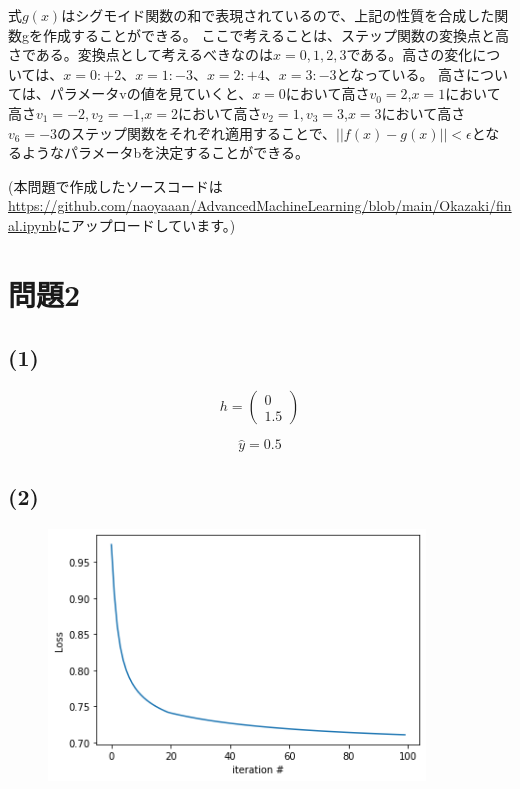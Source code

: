 \documentclass[a4j,11pt]{jarticle}
\begin{document}
式$g(x)$はシグモイド関数の和で表現されているので、上記の性質を合成した関数gを作成することができる。
ここで考えることは、ステップ関数の変換点と高さである。変換点として考えるべきなのは$x = 0,1,2,3$である。高さの変化については、$x=0:+2$、$x=1:-3$、$x=2:+4$、$x=3:-3$となっている。
高さについては、パラメータvの値を見ていくと、$x=0$において高さ$v_0 = 2$,$x=1$において高さ$v_1 = -2,v_2 = -1$,$x=2$において高さ$v_2 = 1,v_3 = 3$,$x=3$において高さ$v_6 = -3$のステップ関数をそれぞれ適用することで、$||f(x) - g(x)|| < \epsilon$となるようなパラメータbを決定することができる。

(本問題で作成したソースコードは\url{https://github.com/naoyaaan/AdvancedMachineLearning/blob/main/Okazaki/final.ipynb}にアップロードしています。)
\newpage
\section{問題2}

\subsection*{(1)}
\begin{equation*}
    h = 
    \begin{pmatrix}
        0 \\
        1.5
    \end{pmatrix}
\end{equation*}

\begin{equation*}
    \hat{y} = 0.5
\end{equation*}

\subsection*{(2)}

\begin{figure}[hbtp]
    \centering
    \includegraphics[width=10cm]{p2-1.png}
\end{figure}
\end{document}
